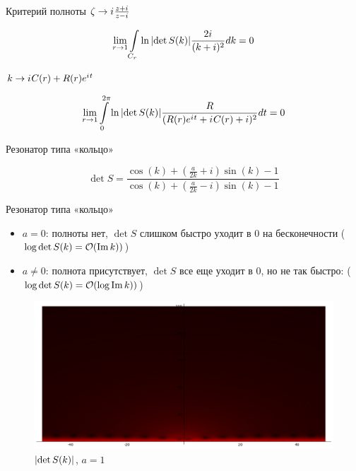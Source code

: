 \documentclass{beamer}
\begin{document}
\begin{frame}{Критерий полноты}
$\zeta \to \iu \frac{z + \iu}{z - \iu}$

\[
\lim\limits_{r \to 1} \int\limits_{C_r} \ln \abs{\det S(k)} \frac{2 \iu}{(k + i)^2} dk = 0
\]

$k \to \iu C(r) + R(r) \eexp{\iu t}$

\[
\lim\limits_{r \to 1} \int\limits_{0}^{2 \pi} \ln \abs{\det S(k)} \frac{R}{(R(r) \eexp{\iu t} + \iu C(r) + i)^2} dt = 0
\]
\end{frame}



\begin{frame}{Резонатор типа «кольцо»}

\begin{figure}
\begin{tikzpicture}[scale=0.8]

\end{tikzpicture}
\end{figure}

\[
\det S = 
\frac
{\cos\left(k\right) + {\left(\frac{a}{2 k} + i\right)} \sin\left(k\right) - 1}
{\cos\left(k\right) + {\left(\frac{a}{2 k} - i\right)} \sin\left(k\right) - 1}
\]

\end{frame}

\begin{frame}{Резонатор типа «кольцо»}
\begin{itemize}
\item $a = 0$: полноты нет, $\det S$ слишком быстро уходит в 0 на бесконечности ($\log \det S(k) = \mcO(\Im k))$)
\item $a \ne 0$: полнота присутствует, $\det S$ все еще уходит в 0, но не так быстро: ($\log \det S(k) = \mcO(\log \Im k))$)
\end{itemize}
\end{frame}

\begin{frame}[plain]
\begin{figure}
\includegraphics[width=\textwidth,height=\textheight,keepaspectratio]{pic/detSa1.png}
\caption{$\abs{\det S(k)}$, $a = 1$}
\end{figure}
\end{frame}
\end{document}
